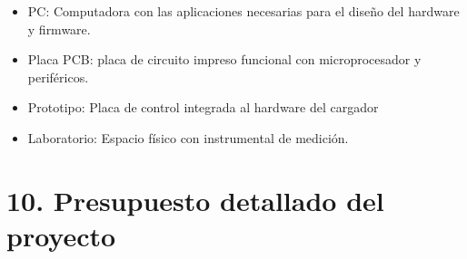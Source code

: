 \documentclass[11pt]{charter}
\begin{document}
\begin{itemize}
 \item PC: Computadora con las aplicaciones necesarias para el diseño del hardware y firmware.
 \item Placa PCB: placa de circuito impreso funcional con microprocesador y periféricos.
 \item Prototipo: Placa de control integrada al hardware del cargador
 \item Laboratorio: Espacio físico con instrumental de medición.
\end{itemize}


\section{10. Presupuesto detallado del proyecto}
\label{sec:presupuesto}



\end{document}
